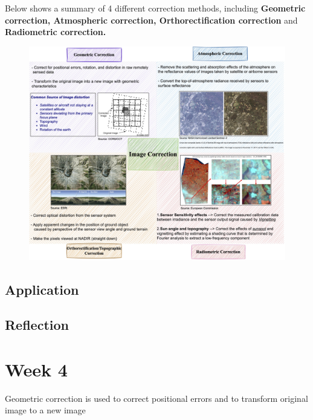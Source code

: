 \documentclass[
  letterpaper,
  DIV=11,
  numbers=noendperiod]{scrreprt}
\begin{document}
Below shows a summary of 4 different correction methods, including
\textbf{Geometric correction, Atmospheric correction, Orthorectification
correction} and \textbf{Radiometric correction.}

\begin{figure}

{\centering \includegraphics[width=1\textwidth,height=\textheight]{./figures/correction summary.jpg}

}

\end{figure}

\hypertarget{application-1}{%
\section{Application}\label{application-1}}

\hypertarget{reflection-1}{%
\section{Reflection}\label{reflection-1}}


\hypertarget{week-4}{%
\chapter{Week 4}\label{week-4}}

Geometric correction is used to correct positional errors and to
transform original image to a new image
\end{document}
